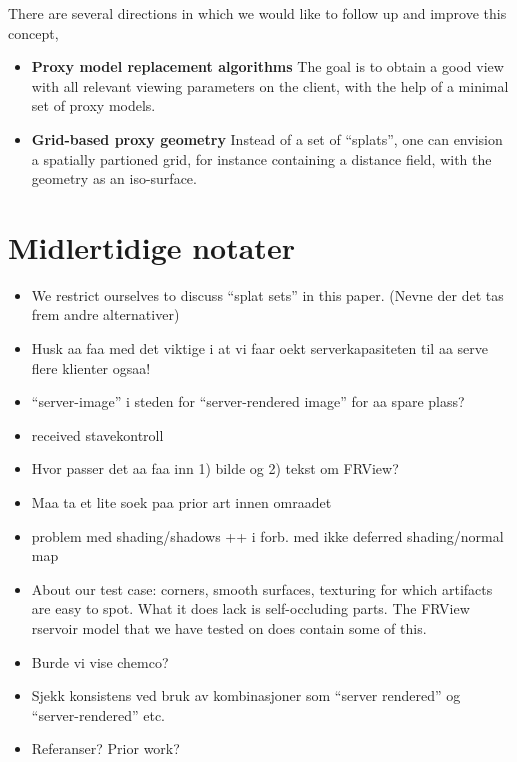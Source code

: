 There are several directions in which we would like to follow up and improve
this concept,
\begin{itemize}
\item \textbf{Proxy model replacement algorithms} The goal is to obtain a good view with
all relevant viewing parameters on the client, with the help of a minimal set of
proxy models.
\item \textbf{Grid-based proxy geometry} Instead of a set of ``splats'', one can
envision a spatially partioned grid, for instance containing a distance field,
with the geometry as an iso-surface.
\end{itemize}




\section{Midlertidige notater}

\begin{itemize}

\item We restrict ourselves to discuss ``splat sets'' in this paper. (Nevne der det
tas frem andre alternativer)

\item
Husk aa faa med det viktige i at vi faar oekt serverkapasiteten til aa
serve flere klienter ogsaa!

\item
``server-image'' i steden for ``server-rendered image'' for aa spare plass?

\item received stavekontroll

\item Hvor passer det aa faa inn 1) bilde og 2) tekst om FRView?

\item Maa ta et lite soek paa prior art innen omraadet

\item problem med shading/shadows ++ i forb. med ikke deferred shading/normal map

\item About our test case: corners, smooth surfaces, texturing for which artifacts are easy to
spot. What it does lack is self-occluding parts. The FRView rservoir model that
we have tested on does contain some of this.

\item Burde vi vise chemco?

\item Sjekk konsistens ved bruk av kombinasjoner som ``server rendered'' og
``server-rendered'' etc.

\item Referanser? Prior work?

\end{itemize}





%






